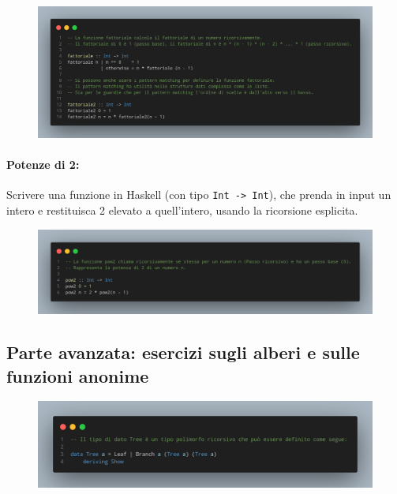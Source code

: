 \begin{figure}[!h]
    \centering
    \includegraphics[width=1\textwidth]{images/Fattoriale2.png}
\end{figure}

\paragraph{Potenze di 2:} Scrivere una funzione in Haskell (con tipo \texttt{Int -> Int}),
che prenda in input un intero e restituisca 2 elevato a quell'intero, usando la ricorsione esplicita.

\begin{figure}[!h]
    \centering
    \includegraphics[width=1\textwidth]{images/Pow2.png}
\end{figure}

\pagebreak

\subsection{Parte avanzata: esercizi sugli alberi e sulle funzioni anonime}

\begin{figure}[!h]
    \centering
    \includegraphics[width=1\textwidth]{images/Tree.png}
\end{figure}

